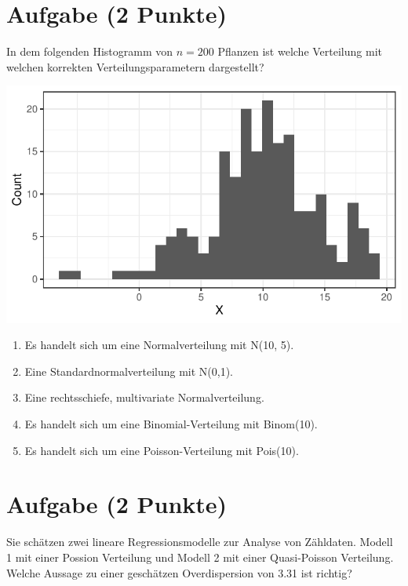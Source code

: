 \documentclass[a4paper, 10pt]{scrartcl}\usepackage[]{graphicx}\usepackage[]{xcolor}
\makeatletter
\def\maxwidth{ %
  \ifdim\Gin@nat@width>\linewidth
    \linewidth
  \else
    \Gin@nat@width
  \fi
}
\makeatother
\begin{document}
\section{Aufgabe \hfill (2 Punkte)}

In dem folgenden Histogramm von $n = 200$ Pflanzen ist welche Verteilung
mit welchen korrekten Verteilungsparametern dargestellt?



{\centering \includegraphics[width=\maxwidth]{img/mc-distribution-02-a-1} 

}







\begin{enumerate}
\item [\textbf{A} \msquare] Es handelt sich um eine Normalverteilung mit N(10, 5).
\item [\textbf{B} \msquare] Eine Standardnormalverteilung mit N(0,1).
\item [\textbf{C} \msquare] Eine rechtsschiefe, multivariate Normalverteilung.
\item [\textbf{D} \msquare] Es handelt sich um eine Binomial-Verteilung mit Binom(10).
\item [\textbf{E} \msquare] Es handelt sich um eine Poisson-Verteilung mit Pois(10).
\end{enumerate}

\section{Aufgabe \hfill (2 Punkte)}



Sie sch{\"a}tzen zwei lineare Regressionsmodelle zur Analyse von
Z{\"a}hldaten. Modell 1 mit einer Possion Verteilung und Modell 2 mit einer
Quasi-Poisson Verteilung. Welche Aussage zu einer gesch{\"a}tzen Overdispersion
von 3.31 ist richtig?
\end{document}
